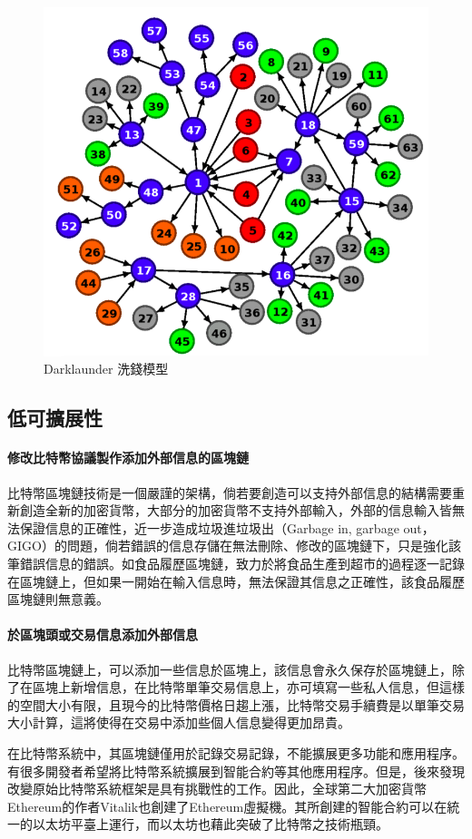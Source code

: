 			\begin{figure}[h]
				\centering
				\includegraphics[width = .7\textwidth]{Darklaunderworkflow.png}
				\caption{Darklaunder 洗錢模型\supercite{AnAnalysisofBitcoinLaundryServices}}\label{Darklaunderworkflow}
			\end{figure}

		\subsection{低可擴展性}

			\paragraph{修改比特幣協議製作添加外部信息的區塊鏈}比特幣區塊鏈技術是一個嚴謹的架構，倘若要創造可以支持外部信息的結構需要重新創造全新的加密貨幣，大部分的加密貨幣不支持外部輸入，外部的信息輸入皆無法保證信息的正確性，近一步造成垃圾進垃圾出（Garbage in, garbage out，GIGO）的問題，倘若錯誤的信息存儲在無法刪除、修改的區塊鏈下，只是強化該筆錯誤信息的錯誤。如食品履歷區塊鏈，致力於將食品生產到超市的過程逐一記錄在區塊鏈上，但如果一開始在輸入信息時，無法保證其信息之正確性，該食品履歷區塊鏈則無意義。
			\paragraph{於區塊頭或交易信息添加外部信息} 比特幣區塊鏈上，可以添加一些信息於區塊上，該信息會永久保存於區塊鏈上，除了在區塊上新增信息，在比特幣單筆交易信息上，亦可填寫一些私人信息，但這樣的空間大小有限，且現今的比特幣價格日趨上漲，比特幣交易手續費是以單筆交易大小計算，這將使得在交易中添加些個人信息變得更加昂貴。

		在比特幣系統中，其區塊鏈僅用於記錄交易記錄，不能擴展更多功能和應用程序。有很多開發者希望將比特幣系統擴展到智能合約等其他應用程序。但是，後來發現改變原始比特幣系統框架是具有挑戰性的工作。因此，全球第二大加密貨幣Ethereum的作者Vitalik也創建了Ethereum虛擬機。其所創建的智能合約可以在統一的以太坊平臺上運行，而以太坊也藉此突破了比特幣之技術瓶頸。